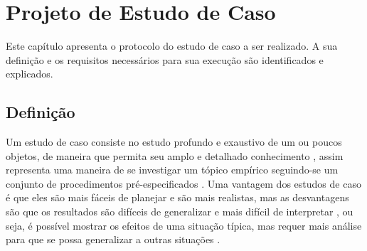 \chapter{Projeto de Estudo de Caso}
\label{chap:proj-est-caso}


Este capítulo apresenta o protocolo do estudo de caso a ser realizado. A sua definição e os requisitos necessários para sua execução são identificados e explicados. 


\section{Definição}\label{sec:Definição}

Um estudo de caso consiste no estudo profundo e exaustivo de um ou poucos objetos, de maneira que permita seu amplo e detalhado conhecimento \cite{gil-estudo}, assim representa uma maneira de se investigar um tópico empírico seguindo-se um conjunto de procedimentos pré-especificados \cite{yin2001estudo}. 
 Uma vantagem dos estudos de caso é que eles são mais fáceis de planejar e são mais realistas, mas as desvantagens são que os resultados são difíceis de generalizar e mais difícil de interpretar , ou seja, é possível mostrar os efeitos de uma situação típica, mas requer mais análise para que se possa generalizar a outras situações \cite{wohlin_experimentation_2012}.

